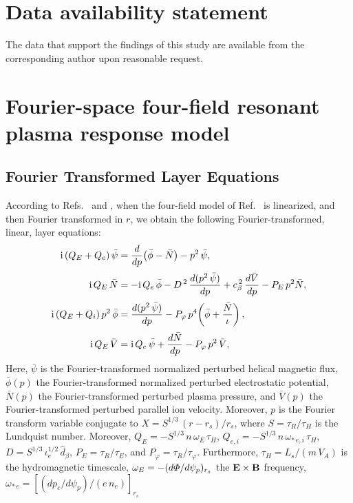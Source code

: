 \documentclass[12pt,prb,aps]{revtex4-1}
\begin{document}
\section*{Data availability statement}
The data that support the findings of this study are available from the corresponding author upon reasonable request.

\appendix
\section{Fourier-space four-field resonant plasma response model}\label{sfour}

\subsection{Fourier Transformed Layer Equations}
According to Refs.~ and , when the four-field model of Ref.~ is linearized, and then Fourier transformed in
$r$,  we obtain the following  Fourier-transformed, linear, layer equations:
\begin{align}\label{e314}
{\rm i}\,(Q_E+Q_e)\,\bar{\psi}&=\frac{d}{dp}\!\left(\bar{\phi}-\bar{N}\right)-p^2\,\bar{\psi},\\[0.5ex]
{\rm i}\,Q_E\,\bar{N} &= - {\rm i}\,Q_{e}\,\bar{\phi} -D^{\,2}\,\frac{d(p^2\,\bar{\psi})}{dp}+ c_\beta^{\,2}\,\frac{d\bar{V}}{dp}
  - P_E\,p^2\bar{N},\label{e316}\\[0.5ex]
{\rm i}\,(Q_E+Q_i)\,p^2\,\bar{\phi}&=  \frac{d(p^2\,\bar{\psi})}{dp}- P_\varphi\,p^4\!\left(\bar{\phi} + \frac{\bar{N}}{\iota}\right),\label{e316a}\\[0.5ex]
{\rm i}\,Q_E\,\bar{V} &= {\rm i}\,Q_{e}\,\bar{\psi} +\frac{d\bar{N}}{dp}- P_\varphi\,p^2\,\bar{V},\label{e317}
\end{align}
Here, $\bar{\psi}$ is the Fourier-transformed normalized perturbed helical magnetic flux, $\bar{\phi}(p)$  the Fourier-transformed normalized perturbed
electrostatic potential, $\bar{N}(p)$  the Fourier-transformed perturbed plasma pressure, and $\bar{V}(p)$  the Fourier-transformed perturbed parallel
ion velocity. Moreover, $p$ is the Fourier transform variable conjugate to $X=S^{1/3}\,(r-r_s)/r_s$, where $S=\tau_R/\tau_H$ is the Lundquist number. 
Moreover, $Q_E=-S^{1/3}\,n\,\omega_E\,\tau_H$, $Q_{e,i}=-S^{1/3}\,n\,\omega_{\ast\,e,i}\,\tau_H$, $D=S^{1/3}\,\iota_e^{1/2}\,\hat{d}_\beta$, 
$P_E=\tau_R/\tau_E$, and $P_\varphi=\tau_R/\tau_\varphi$. Furthermore, $\tau_H=L_s/(m\,V_A)$ is
the hydromagnetic timescale, $\omega_E=-(d{\mit\Phi}/d\psi_p)_{r_s}$ the ${\bf E}\times {\bf B}$ frequency, $\omega_{\ast\,e}=[(dp_e/d\psi_p)/(e\,n_e)]_{r_s}$
\end{document}
